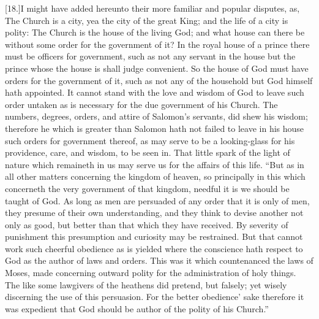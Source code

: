 [18.]I might have added hereunto their more familiar and popular disputes, as, The Church is a city, yea the city of the great King; and the life of a city is polity: The Church is the house of the living God; and what house can there be without some order for the government of it? In the royal house of a prince there must be officers for government, such as not any servant in the house but the prince whose the house is shall judge convenient. So the house of God must have orders for the government of it, such as not any of the household but God himself hath appointed. It cannot stand with the love and wisdom of God to leave such order untaken as is necessary for the due government of his Church. The numbers, degrees, orders, and attire of Salomon’s servants, did shew his wisdom; therefore he which is greater than Salomon hath not failed to leave in his house such orders for government thereof, as may serve to be a looking-glass for his providence, care, and wisdom, to be seen in. That little spark of the light of nature which remaineth in us may serve us for the affairs of this life. “But as in all other matters concerning the kingdom of heaven, so principally in this which concerneth the very government of that kingdom, needful it is we should be taught of God. As long as men are persuaded of any order that it is only of men, they presume of their own understanding, and they think to devise another not only as good, but better than that which they  have received. By severity of punishment this presumption and curiosity may be restrained. But that cannot work such cheerful obedience as is yielded where the conscience hath respect to God as the author of laws and orders. This was it which countenanced the laws of Moses, made concerning outward polity for the administration of holy things. The like some lawgivers of the heathens did pretend, but falsely; yet wisely discerning the use of this persuasion. For the better obedience’ sake therefore it was expedient that God should be author of the polity of his Church.”

